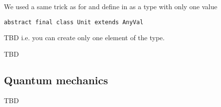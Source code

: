 \begin{example}
\label{ex:scala_initial_object}
We used a same trick as for  and define
 in  as a
type with only one value
\begin{verbatim}
abstract final class Unit extends AnyVal
\end{verbatim}
TBD
i.e. you can create only one element of the type.
\end{example}

TBD

\subsection{Quantum mechanics}
TBD

